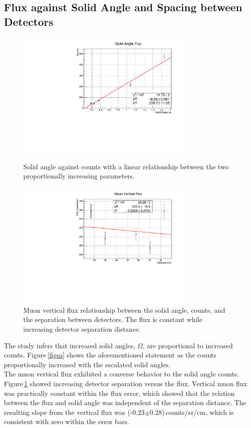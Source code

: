 \documentclass[aps,prl,twocolumn,superscriptaddress,nofootinbib]{revtex4-1}
\begin{document}
\subsection{Flux against Solid Angle and Spacing between Detectors}

\begin{figure}[h!]
  \begin{center}
\centerline{\includegraphics[width=3.5in]{vertsa2.pdf}}
\caption{ \small{Solid angle against counts with a linear relationship between the two proportionally increasing parameters. \label{figsa}}}
%
\vspace{.5 cm}
%
\centerline{\includegraphics[width=3.5in]{vertfd2.pdf}}
\caption{ \small{Muon vertical flux relationship between the solid angle, counts, and the separation between detectors. The flux is constant while increasing detector separation distance. \label{fig1}}}
  \end{center}
\end{figure}

The study infers that increased solid angles, $\Omega$, are proportional to increased counts. Figure\,\ref{figsa} shows the aforementioned statement as the counts proportionally increased with the escalated solid angles.
\\
\indent The muon vertical flux exhibited a converse behavior to the solid angle counts. Figure\,\ref{fig1} showed increasing detector separation versus the flux. Vertical muon flux was practically constant within the flux error, which showed that the relation between the flux and solid angle was independent of the separation distance. The resulting slope from the vertical flux was (-0.23$\pm$0.28)\,counts/sr/cm, which is consistent with zero within the error bars.
\end{document}
